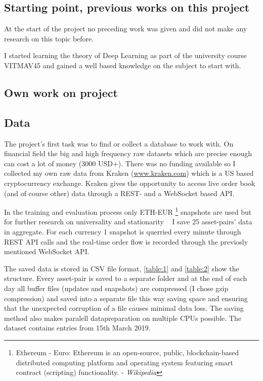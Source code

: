 \documentclass[11pt,a4paper,oneside]{article}
\begin{document}
\subsection{Starting point, previous works on this project}
\label{sec:prev_works}

At the start of the project no preceding work was given and did not make any research on this topic before.

I started learning the theory of Deep Learning as part of the university course VITMAV45 and gained a well based 
knowledge on the subject to start with.

\newpage
\begin{center}
  \section{Own work on project}
  \label{sec:work}
\end{center}

\subsection{Data}
\label{sec:data}

The project's first task was to find or collect a database to work with. On financial field the big and high frequency 
raw datasets which are precise enough can cost a lot of money (3000 USD+). There was no funding available so I collected 
my own raw data from Kraken (\url{www.kraken.com}) which is a US based cryptocurrency exchange. Kraken gives the 
opportunity to access live order book (and of course other) data through a REST- and a WebSocket based API. 

In the training and evaluation process only ETH-EUR \footnote{Ethereum - Euro: Ethereum is an open-source, public, 
blockchain-based distributed computing platform and operating system featuring smart contract (scripting) functionality. 
- \textit{Wikipedia} } snapshots are used but for further research on universality and stationarity ~\cite{univ} I save 
25 asset-pairs' data in aggregate. For each currency 1 snapshot is querried every minute through REST API calls and the 
real-time order flow is recorded through the previosly mentioned WebSocket API.  

The saved data is stored in CSV file format, \autoref{table:1} and \autoref{table:2} show the structure. Every 
asset-pair is saved to a separate folder and at the end of each day all buffer files (updates and snapshots) are 
compressed (I chose gzip compression) and saved into a separate file this way saving space and ensuring that the 
unexpected corruption of a file causes minimal data loss. The saving method also makes paralell datapreparation on 
multiple CPUs possible. The dataset contains entries from 15th March 2019.
\end{document}

